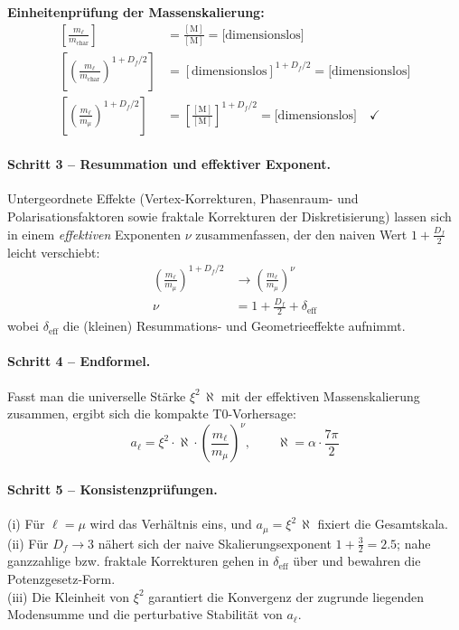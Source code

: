 \documentclass[12pt,a4paper]{article}
\newcommand{\xipar}{\xi}
\newcommand{\alphagem}{\alpha}
\newcommand{\nulep}{\nu}
\newcommand{\mchar}{m_{\text{char}}}
\theoremstyle{remark}
\begin{document}
\begin{units}
	\textbf{Einheitenprüfung der Massenskalierung:}
	\begin{align}
		\left[\frac{m_\ell}{\mchar}\right] &= \frac{[\text{M}]}{[\text{M}]} = \text{[dimensionslos]} \\
		\left[\left(\frac{m_\ell}{\mchar}\right)^{1+D_f/2}\right] &= [\text{dimensionslos}]^{1+D_f/2} = \text{[dimensionslos]} \\
		\left[\left(\frac{m_\ell}{m_\mu}\right)^{1+D_f/2}\right] &= \left[\frac{[\text{M}]}{[\text{M}]}\right]^{1+D_f/2} = \text{[dimensionslos]} \quad \checkmark
	\end{align}
\end{units}

\paragraph{Schritt 3 -- Resummation und effektiver Exponent.}
Untergeordnete Effekte (Vertex-Korrekturen, Phasenraum- und Polarisationsfaktoren sowie fraktale Korrekturen der Diskretisierung) lassen sich in einem \emph{effektiven} Exponenten $\nulep$ zusammenfassen, der den naiven Wert $1+\tfrac{D_f}{2}$ leicht verschiebt:
\begin{align}
	\left(\frac{m_\ell}{m_\mu}\right)^{1+D_f/2} &\longrightarrow \left(\frac{m_\ell}{m_\mu}\right)^{\nulep} \\
	\nulep &= 1+\frac{D_f}{2}+\delta_\text{eff}
\end{align}
wobei $\delta_\text{eff}$ die (kleinen) Resummations- und Geometrieeffekte aufnimmt.

\paragraph{Schritt 4 -- Endformel.}
Fasst man die universelle Stärke $\xipar^2\,\aleph$ mit der effektiven Massenskalierung zusammen, ergibt sich die kompakte T0-Vorhersage:
\begin{equation}
	a_\ell = \xipar^2 \cdot \aleph \cdot \left(\frac{m_\ell}{m_\mu}\right)^{\nulep}, \qquad \aleph = \alphagem \cdot \frac{7\pi}{2}
\end{equation}

\paragraph{Schritt 5 -- Konsistenzprüfungen.}
(i) Für $\ell=\mu$ wird das Verhältnis eins, und $a_\mu=\xipar^2\,\aleph$ fixiert die Gesamtskala.\\
(ii) Für $D_f\to 3$ nähert sich der naive Skalierungsexponent $1+\tfrac{3}{2}=2.5$; nahe ganzzahlige bzw. fraktale Korrekturen gehen in $\delta_\text{eff}$ über und bewahren die Potenzgesetz-Form.\\
(iii) Die Kleinheit von $\xi^2$ garantiert die Konvergenz der zugrunde liegenden Modensumme und die perturbative Stabilität von $a_\ell$.
\end{document}
